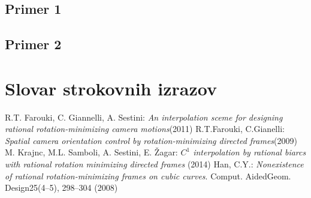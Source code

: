 \documentclass[mat1]{fmfdelo}
\begin{document}
\subsection{Primer 1}
\subsection{Primer 2}


\section*{Slovar strokovnih izrazov}


\begin{thebibliography}{99}
\bibitem{}R.T. Farouki, C. Giannelli, A. Sestini: \emph{An interpolation sceme for designing rational rotation-minimizing camera motions}(2011)
\bibitem{} R.T.Farouki, C.Gianelli: \emph{Spatial camera orientation control by rotation-minimizing directed frames}(2009)
\bibitem{} M. Krajnc, M.L. Samboli, A. Sestini, E. Žagar: \emph{$C^1$ interpolation by rational biarcs with rational rotation minimizing directed frames} (2014)
\bibitem{}{\label{neobstaja}} Han, C.Y.: \emph{Nonexistence of rational rotation-minimizing frames on cubic curves}. Comput. AidedGeom. Design25(4–5), 298–304 (2008)

\end{thebibliography}
\end{document}
